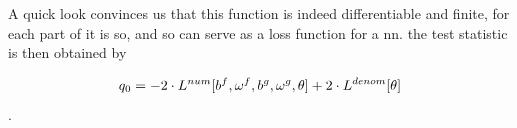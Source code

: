 \documentclass[../../ddppaper2.tex]{subfiles}
\begin{document}
A quick look convinces us that this function is indeed differentiable and finite, for each part of it is so, and so can serve as a loss function for a \gls{nn}. the test statistic is then obtained by

\begin{equation}
\label{eq:t_value_from_two_losses}
    \invllratio = -2 \cdot L^{num}[b^f, \omega^f, b^g, \omega^g, \nparam] + 2 \cdot L^{denom}[\nparam]
\end{equation}.
\end{document}
